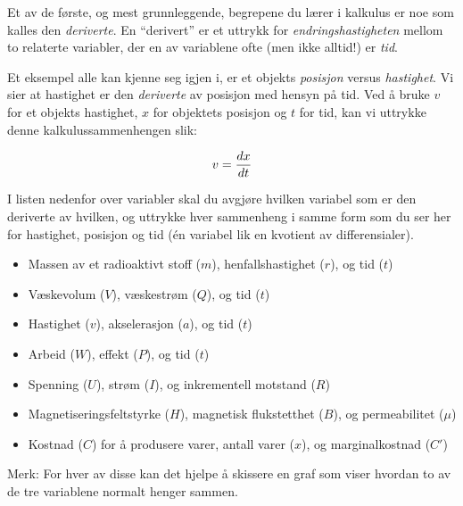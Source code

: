 

Et av de første, og mest grunnleggende, begrepene du lærer i kalkulus er noe som kalles den {\it deriverte}. En ``derivert'' er et uttrykk for {\it endringshastigheten} mellom to relaterte variabler, der en av variablene ofte (men ikke alltid!) er {\it tid}.

Et eksempel alle kan kjenne seg igjen i, er et objekts {\it posisjon} versus {\it hastighet}. Vi sier at hastighet er den {\it deriverte} av posisjon med hensyn på tid. Ved å bruke $v$ for et objekts hastighet, $x$ for objektets posisjon og $t$ for tid, kan vi uttrykke denne kalkulussammenhengen slik:

$$v = {dx \over dt}$$

\filbreak

I listen nedenfor over variabler skal du avgjøre hvilken variabel som er den deriverte av hvilken, og uttrykke hver sammenheng i samme form som du ser her for hastighet, posisjon og tid (én variabel lik en kvotient av differensialer).

\vskip 10pt

\begin{itemize}
\item{} Massen av et radioaktivt stoff ($m$), henfallshastighet ($r$), og tid ($t$)
\vskip 10pt 
\item{} Væskevolum ($V$), væskestrøm ($Q$), og tid ($t$)
\vskip 10pt 
\item{} Hastighet ($v$), akselerasjon ($a$), og tid ($t$)
\vskip 10pt 
\item{} Arbeid ($W$), effekt ($P$), og tid ($t$)
\vskip 10pt 
\item{} Spenning ($U$), strøm ($I$), og inkrementell motstand ($R$)
\vskip 10pt 
\item{} Magnetiseringsfeltstyrke ($H$), magnetisk flukstetthet ($B$), og permeabilitet ($\mu$)
\vskip 10pt 
\item{} Kostnad ($C$) for å produsere varer, antall varer ($x$), og marginalkostnad ($C'$)
\end{itemize}

\vskip 10pt

Merk: For hver av disse kan det hjelpe å skissere en graf som viser hvordan to av de tre variablene normalt henger sammen.






